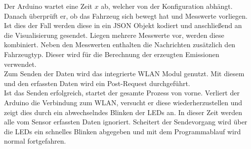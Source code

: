 \documentclass[.../Dokumentation.tex]{subfiles}
\begin{document}
    Der Arduino wartet eine Zeit $x$ ab, welcher von der Konfiguration abhängt. Danach überprüft er, ob das Fahrzeug sich bewegt hat und Messwerte vorliegen. Ist dies der Fall werden diese in ein JSON Objekt kodiert und anschließend an die Visualisierung gesendet. Liegen mehrere Messwerte vor, werden diese kombiniert. Neben den Messwerten enthalten die Nachrichten zusätzlich den Fahrzeugtyp. Dieser wird für die Berechnung der erzeugten Emissionen verwendet.\\
    Zum Senden der Daten wird das integrierte WLAN Modul genutzt. Mit diesem und den erfassten Daten wird ein Post-Request durchgeführt.\\
   	Ist das Senden erfolgreich, startet der gesamte Prozess von vorne. Verliert der Arduino die Verbindung zum WLAN, versucht er diese wiederherzustellen und zeigt dies durch ein abwechselndes Blinken der LEDs an. In dieser Zeit werden alle vom Sensor erfassten Daten ignoriert. Scheitert der Sendevorgang wird über die LEDs ein schnelles  Blinken abgegeben und mit dem Programmablauf wird normal fortgefahren. 
\end{document}
